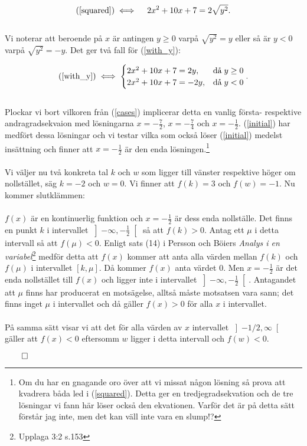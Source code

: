 \documentclass{article}
\begin{document}
\begin{gather}
  \text{(\ref{squared})} \iff \quad 2x^2 + 10x + 7 = 2\sqrt{y^2}\text{.} \label{with_y}
\end{gather}
\\
Vi noterar att beroende på $x$ är antingen $y \geq 0$ varpå $\sqrt{y^{2}} = y$ eller så är $y < 0$ varpå $\sqrt{y^{2}} = -y$. Det ger två fall för (\ref{with_y}):

\begin{align}
  \text{(\ref{with_y})} \iff
  \begin{cases}
    2x^{2} + 10x + 7 = 2y, & \text{då}\; y \geq 0 \\
    2x^{2} + 10x + 7 = -2y, & \text{då}\; y < 0
  \end{cases}\text{.} \label{cases}
\end{align}
\\
Plockar vi bort vilkoren från (\ref{cases}) implicerar detta en vanlig första- respektive andragradsekvaion med lösningarna $x = -\tfrac{7}{2}$, $x = -\tfrac{7}{4}$ och $x = -\tfrac{1}{2}$. (\ref{initial}) har medfört dessa lösningar och vi testar vilka som också löser (\ref{initial}) medelst insättning och finner att $x = -\tfrac{1}{2}$ är den enda lösningen.\footnote{Om du har en gnagande oro över att vi missat någon lösning så prova att kvadrera båda led i (\ref{squared}). Detta ger en tredjegradsekvation och de tre lösningar vi fann här löser också den ekvationen. Varför det är på detta sätt förstår jag inte, men det kan väll inte vara en slump!?}
\\
\\
Vi väljer nu två konkreta tal $k$ och $w$ som ligger till vänster respektive höger om nollstället, säg $k = -2$ och $w = 0$. Vi finner att $f(k) = 3$ och $f(w) = -1$. Nu kommer slutklämmen:
\\
\\
$f(x)$ är en kontinuerlig funktion och $x = -\tfrac{1}{2}$ är dess enda nollställe. Det finns en punkt $k$ i intervallet $\left]-\infty, -\tfrac{1}{2}\right[$ så att $f(k) > 0$. Antag ett $\mu$ i detta intervall så att $f(\mu) < 0$. Enligt sats (14) i Persson och Böiers \emph{Analys i en variabel}\footnote{Upplaga 3:2 s.153} medför detta att $f(x)$ kommer att anta alla värden mellan $f(k)$ och $f(\mu)$ i intervallet $\left[k, \mu\right]$. Då kommer $f(x)$ anta värdet $0$. Men $x = -\tfrac{1}{2}$ är det enda nollstället till $f(x)$ och ligger inte i intervallet $\left]-\infty, -\tfrac{1}{2}\right[$. Antagandet att $\mu$ finns har producerat en motsägelse, alltså måste motsatsen vara sann; det finns inget $\mu$ i intervallet och då gäller $f(x) > 0$ för alla $x$ i intervallet.
\\
\\På samma sätt visar vi att det för alla värden av $x$ intervallet $ \left]-1/2, \infty\right[$ gäller att $f(x) < 0$ eftersomm $w$ ligger i detta intervall och $f(w) < 0$.

\centerline{$\qed$}
\end{document}
